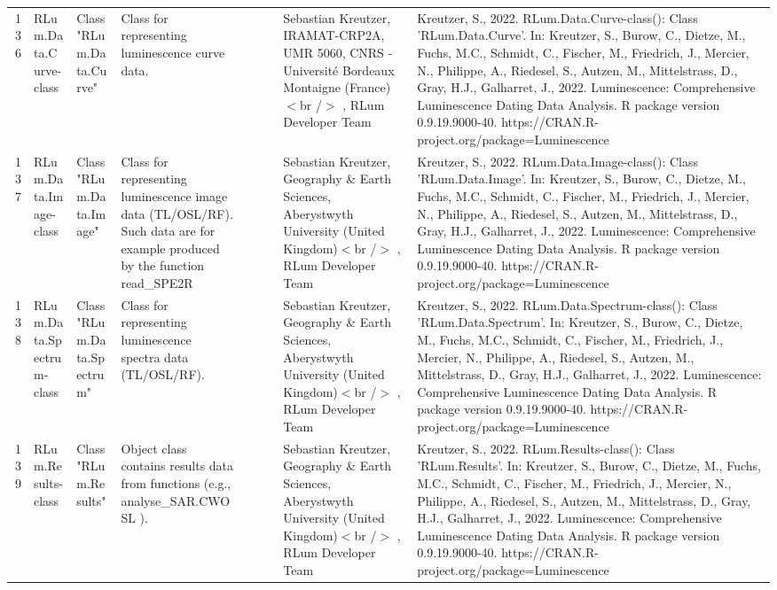 \begin{table}[ht]
\begin{tabular}{rllllllll}
  136 & RLum.Data.Curve-class & Class  "RLum.Data.Curve" & Class for representing luminescence curve data. &  &  &  & Sebastian Kreutzer, IRAMAT-CRP2A, UMR 5060, CNRS - Université Bordeaux Montaigne (France)$<$br /$>$ , RLum Developer Team & Kreutzer, S., 2022. RLum.Data.Curve-class(): Class 'RLum.Data.Curve'. In: Kreutzer, S., Burow, C., Dietze, M., Fuchs, M.C., Schmidt, C., Fischer, M., Friedrich, J., Mercier, N., Philippe, A., Riedesel, S., Autzen, M., Mittelstrass, D., Gray, H.J., Galharret, J., 2022. Luminescence: Comprehensive Luminescence Dating Data Analysis. R package version 0.9.19.9000-40. https://CRAN.R-project.org/package=Luminescence
 \\ 
  137 & RLum.Data.Image-class & Class  "RLum.Data.Image" & Class for representing luminescence image data (TL/OSL/RF). Such data are for example produced by the function  read\_SPE2R &  &  &  & Sebastian Kreutzer, Geography \& Earth Sciences, Aberystwyth University (United Kingdom)$<$br /$>$ , RLum Developer Team & Kreutzer, S., 2022. RLum.Data.Image-class(): Class 'RLum.Data.Image'. In: Kreutzer, S., Burow, C., Dietze, M., Fuchs, M.C., Schmidt, C., Fischer, M., Friedrich, J., Mercier, N., Philippe, A., Riedesel, S., Autzen, M., Mittelstrass, D., Gray, H.J., Galharret, J., 2022. Luminescence: Comprehensive Luminescence Dating Data Analysis. R package version 0.9.19.9000-40. https://CRAN.R-project.org/package=Luminescence
 \\ 
  138 & RLum.Data.Spectrum-class & Class  "RLum.Data.Spectrum" & Class for representing luminescence spectra data (TL/OSL/RF). &  &  &  & Sebastian Kreutzer, Geography \& Earth Sciences, Aberystwyth University (United Kingdom)$<$br /$>$ , RLum Developer Team & Kreutzer, S., 2022. RLum.Data.Spectrum-class(): Class 'RLum.Data.Spectrum'. In: Kreutzer, S., Burow, C., Dietze, M., Fuchs, M.C., Schmidt, C., Fischer, M., Friedrich, J., Mercier, N., Philippe, A., Riedesel, S., Autzen, M., Mittelstrass, D., Gray, H.J., Galharret, J., 2022. Luminescence: Comprehensive Luminescence Dating Data Analysis. R package version 0.9.19.9000-40. https://CRAN.R-project.org/package=Luminescence
 \\ 
  139 & RLum.Results-class & Class  "RLum.Results" & Object class contains results data from functions (e.g.,  analyse\_SAR.CWOSL ). &  &  &  & Sebastian Kreutzer, Geography \& Earth Sciences, Aberystwyth University (United Kingdom)$<$br /$>$ , RLum Developer Team & Kreutzer, S., 2022. RLum.Results-class(): Class 'RLum.Results'. In: Kreutzer, S., Burow, C., Dietze, M., Fuchs, M.C., Schmidt, C., Fischer, M., Friedrich, J., Mercier, N., Philippe, A., Riedesel, S., Autzen, M., Mittelstrass, D., Gray, H.J., Galharret, J., 2022. Luminescence: Comprehensive Luminescence Dating Data Analysis. R package version 0.9.19.9000-40. https://CRAN.R-project.org/package=Luminescence

\end{tabular}
\end{table}
